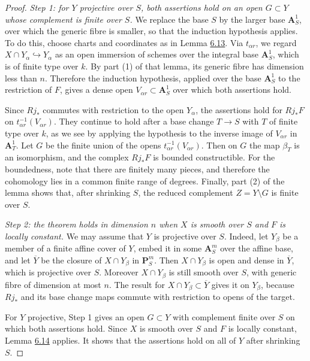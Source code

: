 \documentclass[11pt]{article}
\begin{document}
\begin{proof}[{Proof}]
\emph{Step 1: for \(Y\) projective over \(S\), both assertions hold on an open \(G\subset Y\) whose complement is finite over \(S\).} We replace the base \(S\) by the larger base \(\mathbf A^1_S\), over which the generic fibre is smaller, so that the induction hypothesis applies. To do this, choose charts and coordinates as in Lemma \hyperref[bp553]{6.13}. Via \(t_{\alpha r}\), we regard \(X\cap Y_\alpha\hookrightarrow Y_\alpha\) as an open immersion of schemes over the integral base \(\mathbf A^1_S\), which is of finite type over \(k\). By part (1) of that lemma, its generic fibre has dimension less than \(n\). Therefore the induction hypothesis, applied over the base \(\mathbf A^1_S\) to the restriction of \(F\), gives a dense open \(V_{\alpha r}\subset\mathbf A^1_S\) over which both assertions hold.

Since \(Rj_*\) commutes with restriction to the open \(Y_\alpha\), the assertions hold for \(Rj_*F\) on \(t_{\alpha r}^{-1}(V_{\alpha r})\). They continue to hold after a base change \(T\to S\) with \(T\) of finite type over \(k\), as we see by applying the hypothesis to the inverse image of \(V_{\alpha r}\) in \(\mathbf A^1_T\). Let \(G\) be the finite union of the opens \(t_{\alpha r}^{-1}(V_{\alpha r})\). Then on \(G\) the map \(\beta_T\) is an isomorphism, and the complex \(Rj_*F\) is bounded constructible. For the boundedness, note that there are finitely many pieces, and therefore the cohomology lies in a common finite range of degrees. Finally, part (2) of the lemma shows that, after shrinking \(S\), the reduced complement \(Z=Y\setminus G\) is finite over \(S\).

\emph{Step 2: the theorem holds in dimension \(n\) when \(X\) is smooth over \(S\) and \(F\) is locally constant.} We may assume that \(Y\) is projective over \(S\). Indeed, let \(Y_\beta\) be a member of a finite affine cover of \(Y\), embed it in some \(\mathbf A^m_S\) over the affine base, and let \(\overline Y\) be the closure of \(X\cap Y_\beta\) in \(\mathbf P^m_S\). Then \(X\cap Y_\beta\) is open and dense in \(\overline Y\), which is projective over \(S\). Moreover \(X\cap Y_\beta\) is still smooth over \(S\), with generic fibre of dimension at most \(n\). The result for \(X\cap Y_\beta\subset\overline Y\) gives it on \(Y_\beta\), because \(Rj_*\) and its base change maps commute with restriction to opens of the target.

For \(Y\) projective, Step 1 gives an open \(G\subset Y\) with complement finite over \(S\) on which both assertions hold. Since \(X\) is smooth over \(S\) and \(F\) is locally constant, Lemma \hyperref[bp557]{6.14} applies. It shows that the assertions hold on all of \(Y\) after shrinking \(S\).


\end{proof}
\end{document}
